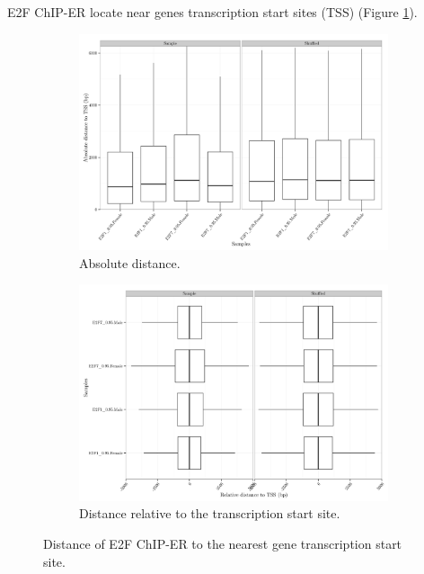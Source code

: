 \documentclass[11pt,twoside,a4paper]{report}
\begin{document}
		E2F ChIP-ER locate near genes transcription start sites (TSS) (Figure \ref{fig:distance_to_TSS}).
		
		\begin{figure}[here]
			\setlength{\belowcaptionskip}{5pt}
			\centering
			\begin{subfigure}[b]{0.75\textwidth}
				\includegraphics[width=1\linewidth]{pngs/E2F_distanceTSS_abs.png}
				\caption{Absolute distance.}
			\end{subfigure}
			\begin{subfigure}[b]{0.75\textwidth}
				\includegraphics[width=1\linewidth]{pngs/E2F_distanceTSS_rel.png}
				\caption{Distance relative to the transcription start site.}
			\end{subfigure}
			\caption{Distance of E2F ChIP-ER to the nearest gene transcription start site.}\label{dummy}
			\label{fig:distance_to_TSS}
		\end{figure}
		
\end{document}
